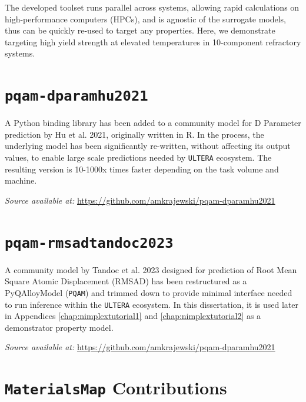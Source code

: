 The developed toolset runs parallel across systems, allowing rapid calculations on high-performance computers (HPCs), and is agnostic of the surrogate models, thus can be quickly re-used to target any properties. Here, we demonstrate targeting high yield strength at elevated temperatures in 10-component refractory systems.


\section{\texttt{pqam-dparamhu2021}} \label{osoft:sec:dparam}

A Python binding library has been added to a community model for D Parameter prediction by Hu et al. 2021, originally written in R. In the process, the underlying model has been significantly re-written, without affecting its output values, to enable large scale predictions needed by \texttt{ULTERA} ecosystem. The resulting version is 10-1000x times faster depending on the task volume and machine.

\hspace{24pt} 
\textit{Source available at:} 
\href{https://github.com/amkrajewski/pqam-dparamhu2021}{https://github.com/amkrajewski/pqam-dparamhu2021}



\section{\texttt{pqam-rmsadtandoc2023}} \label{osoft:sec:rmsad}

A community model by Tandoc et al. 2023 designed for prediction of Root Mean Square Atomic Displacement (RMSAD) has been restructured as a PyQAlloyModel (\texttt{PQAM}) and trimmed down to provide minimal interface needed to run inference within the \texttt{ULTERA} ecosystem. In this dissertation, it is used later in Appendices \ref{chap:nimplextutorial1} and \ref{chap:nimplextutorial2} as a demonstrator property model.

\hspace{24pt} 
\textit{Source available at:} 
\href{https://github.com/amkrajewski/pqam-dparamhu2021}{https://github.com/amkrajewski/pqam-dparamhu2021}




\section{\texttt{MaterialsMap} Contributions} \label{osoft:sec:materialsmap}

